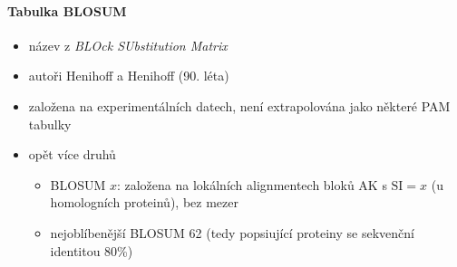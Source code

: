 \documentclass[DIV=8]{scrreprt}
\begin{document}
\paragraph{Tabulka BLOSUM}
\begin{itemize}[nosep]
    \item název z \emph{BLOck SUbstitution Matrix}
    \item autoři Henihoff a Henihoff (90. léta)
    \item založena na experimentálních datech, není extrapolována jako některé PAM tabulky
    \item opět více druhů
\begin{itemize}[nosep]
    \item BLOSUM \(x\): založena na lokálních alignmentech bloků AK s \(\text{SI}=x\) (u homologních proteinů), bez mezer
    \item nejoblíbenější BLOSUM 62 (tedy popsiující proteiny se sekvenční identitou 80\%)
\end{itemize}

\end{itemize}
\end{document}
